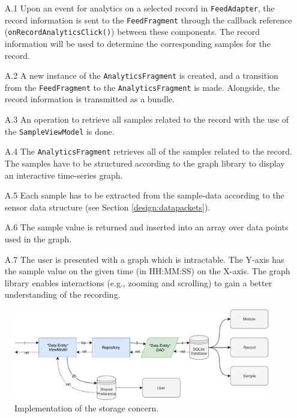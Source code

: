 \begin{itemize}
    \item[A.1] Upon an event for analytics on a selected record in \verb|FeedAdapter|, the record information is sent to the \verb|FeedFragment| through the callback reference (\verb|onRecordAnalyticsClick()|) between these components. The record information will be used to determine the corresponding samples for the record.
    \item[A.2] A new instance of the \verb|AnalyticsFragment| is created, and a transition from the \verb|FeedFragment| to the \verb|AnalyticsFragment| is made. Alongside, the record information is transmitted as a bundle.
    \item[A.3] An operation to retrieve all samples related to the record with the use of the \verb|SampleViewModel| is done. 
    \item[A.4] The \verb|AnalyticsFragment| retrieves all of the samples related to the record. The samples have to be structured according to the graph library to display an interactive time-series graph.
    \item[A.5] Each sample has to be extracted from the sample-data according to the sensor data structure (see Section \ref{design:datapackets}).
    \item[A.6] The sample value is returned and inserted into an array over data points used in the graph. 
    \item[A.7] The user is presented with a graph which is intractable. The Y-axis has the sample value on the given time (in HH:MM:SS) on the X-axis. The graph library enables interactions (e.g., zooming and scrolling) to gain a better understanding of the recording. 
\end{itemize}

\begin{figure}[!h]
    \centering
    \includegraphics[scale=0.60]{images/Storage_Imp.pdf}
    \caption{Implementation of the storage concern.}
    \label{fig:impl_storage}
\end{figure}

